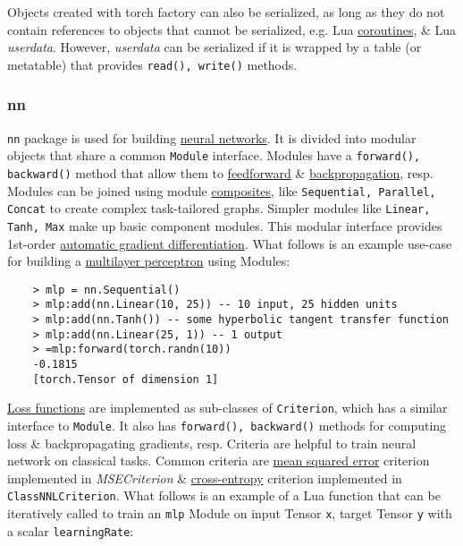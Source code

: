 \documentclass{article}
\begin{document}
Objects created with torch factory can also be serialized, as long as they do not contain references to objects that cannot be serialized, e.g. Lua \href{https://en.wikipedia.org/wiki/Coroutine}{coroutines}, \& Lua {\it userdata}. However, {\it userdata} can be serialized if it is wrapped by a table (or metatable) that provides {\tt read(), write()} methods.

\subsubsection{nn}
{\tt nn} package is used for building \href{https://en.wikipedia.org/wiki/Neural_network}{neural networks}. It is divided into modular objects that share a common {\tt Module} interface. Modules have a {\tt forward(), backward()} method that allow them to \href{https://en.wikipedia.org/wiki/Feedforward_neural_network}{feedforward} \& \href{https://en.wikipedia.org/wiki/Backpropagation}{backpropagation}, resp. Modules can be joined using module \href{https://en.wikipedia.org/wiki/Composite_pattern}{composites}, like {\tt Sequential, Parallel, Concat} to create complex task-tailored graphs. Simpler modules like {\tt Linear, Tanh, Max} make up basic component modules. This modular interface provides 1st-order \href{https://en.wikipedia.org/wiki/Automatic_differentiation}{automatic gradient differentiation}. What follows is an example use-case for building a \href{https://en.wikipedia.org/wiki/Multilayer_perceptron}{multilayer perceptron} using Modules:
\begin{verbatim}
	> mlp = nn.Sequential()
	> mlp:add(nn.Linear(10, 25)) -- 10 input, 25 hidden units
	> mlp:add(nn.Tanh()) -- some hyperbolic tangent transfer function
	> mlp:add(nn.Linear(25, 1)) -- 1 output
	> =mlp:forward(torch.randn(10))
	-0.1815
	[torch.Tensor of dimension 1]
\end{verbatim}
\href{https://en.wikipedia.org/wiki/Loss_function}{Loss functions} are implemented as sub-classes of {\tt Criterion}, which has a similar interface to {\tt Module}. It also has {\tt forward(), backward()} methods for computing loss \& backpropagating gradients, resp. Criteria are helpful to train neural network on classical tasks. Common criteria are \href{https://en.wikipedia.org/wiki/Mean_squared_error}{mean squared error} criterion implemented in {\it MSECriterion} \& \href{https://en.wikipedia.org/wiki/Cross-entropy}{cross-entropy} criterion implemented in {\tt ClassNNLCriterion}. What follows is an example of a Lua function that can be iteratively called to train an {\tt mlp} Module on input Tensor {\tt x}, target Tensor {\tt y} with a scalar {\tt learningRate}:
\end{document}
